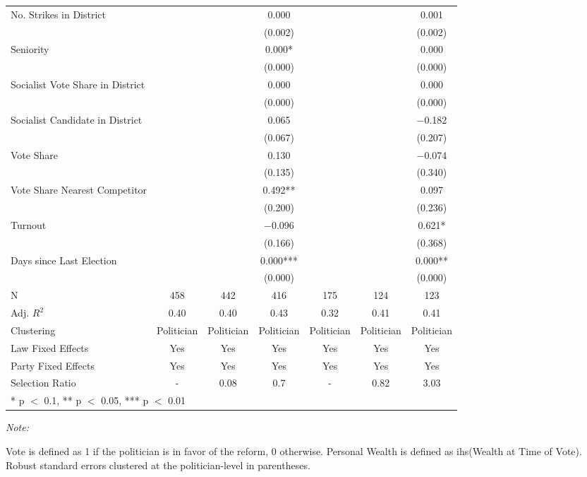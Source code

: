 \begin{table}[!h]
{\begin{threeparttable}
\begin{tabular}[t]{lcccccc}
No. Strikes in District &  &  & \num{0.000} &  &  & \num{0.001}\\
 &  &  & (\num{0.002}) &  &  & (\num{0.002})\\
Seniority &  &  & \num{0.000}* &  &  & \num{0.000}\\
 &  &  & (\num{0.000}) &  &  & \vphantom{2} (\num{0.000})\\
Socialist Vote Share in District &  &  & \num{0.000} &  &  & \num{0.000}\\
 &  &  & (\num{0.000}) &  &  & \vphantom{1} (\num{0.000})\\
Socialist Candidate in District &  &  & \num{0.065} &  &  & \num{-0.182}\\
 &  &  & (\num{0.067}) &  &  & (\num{0.207})\\
Vote Share &  &  & \num{0.130} &  &  & \num{-0.074}\\
 &  &  & (\num{0.135}) &  &  & (\num{0.340})\\
Vote Share Nearest Competitor &  &  & \num{0.492}** &  &  & \num{0.097}\\
 &  &  & (\num{0.200}) &  &  & (\num{0.236})\\
Turnout &  &  & \num{-0.096} &  &  & \num{0.621}*\\
 &  &  & (\num{0.166}) &  &  & (\num{0.368})\\
Days since Last Election &  &  & \num{0.000}*** &  &  & \num{0.000}**\\
 &  &  & (\num{0.000}) &  &  & (\num{0.000})\\
\midrule
N & \num{458} & \num{442} & \num{416} & \num{175} & \num{124} & \num{123}\\
Adj. $R^2$ & \num{0.40} & \num{0.40} & \num{0.43} & \num{0.32} & \num{0.41} & \num{0.41}\\
Clustering & Politician & Politician & Politician & Politician & Politician & Politician\\
Law Fixed Effects & Yes & Yes & Yes & Yes & Yes & Yes\\
Party Fixed Effects & Yes & Yes & Yes & Yes & Yes & Yes\\
Selection Ratio & - & 0.08 & 0.7 & - & 0.82 & 3.03\\
\bottomrule
\multicolumn{7}{l}{\rule{0pt}{1em}* p $<$ 0.1, ** p $<$ 0.05, *** p $<$ 0.01}\\
\end{tabular}
\begin{tablenotes}[para]
\item \textit{Note: } 
\item Vote is defined as 1 if the politician is in favor of the reform, 0 otherwise. Personal Wealth is defined as ihs(Wealth at Time of Vote). Robust standard errors clustered at the politician-level in parentheses.
\end{tablenotes}
\end{threeparttable}}
\end{table}
